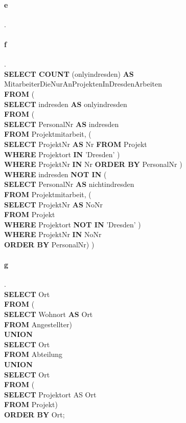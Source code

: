 \documentclass{article}
\begin{document}
		
		\paragraph*{e}.\\
		
		\paragraph*{f}.\\
			\textbf{SELECT COUNT} (onlyindresden) \textbf{AS} MitarbeiterDieNurAnProjektenInDresdenArbeiten\\ \textbf{FROM} (\\
			\textbf{SELECT} indresden \textbf{AS} onlyindresden\\ \textbf{FROM} (\\
			\textbf{SELECT} PersonalNr \textbf{AS} indresden\\ \textbf{FROM} Projektmitarbeit, (\\
			\textbf{SELECT} ProjektNr \textbf{AS} Nr \textbf{FROM} Projekt \\
			\textbf{WHERE} Projektort \textbf{IN} 'Dresden'
			)\\
			\textbf{WHERE} ProjektNr \textbf{IN} Nr \textbf{ORDER BY} PersonalNr
			)\\
			\textbf{WHERE} indresden \textbf{NOT IN} (\\
			\textbf{SELECT} PersonalNr \textbf{AS} nichtindresden\\ \textbf{FROM} Projektmitarbeit, (\\
			\textbf{SELECT} ProjektNr \textbf{AS} NoNr\\ 
			\textbf{FROM} Projekt\\ 
			\textbf{WHERE} Projektort \textbf{NOT IN} 'Dresden'
			)\\
			\textbf{WHERE} ProjektNr \textbf{IN} NoNr\\ \textbf{ORDER BY} PersonalNr)
			)
		\pagebreak	
		\paragraph*{g}.\\
			\textbf{SELECT} Ort\\ \textbf{FROM} (\\\textbf{SELECT} Wohnort \textbf{AS} Ort\\ \textbf{FROM} Angestellter) \\
			\textbf{UNION} \\
			\textbf{SELECT} Ort\\ \textbf{FROM} Abteilung\\
			\textbf{UNION}\\
			\textbf{SELECT} Ort\\ \textbf{FROM} (\\ \textbf{SELECT} Projektort AS Ort\\ \textbf{FROM} Projekt)\\
			\textbf{ORDER BY} Ort;
				
\end{document}

